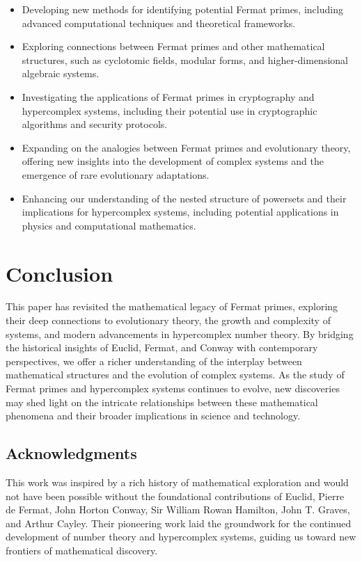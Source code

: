 \documentclass[12pt]{article}
\begin{document}
\begin{itemize}
    \item Developing new methods for identifying potential Fermat primes, including advanced computational techniques and theoretical frameworks.
    \item Exploring connections between Fermat primes and other mathematical structures, such as cyclotomic fields, modular forms, and higher-dimensional algebraic systems.
    \item Investigating the applications of Fermat primes in cryptography and hypercomplex systems, including their potential use in cryptographic algorithms and security protocols.
    \item Expanding on the analogies between Fermat primes and evolutionary theory, offering new insights into the development of complex systems and the emergence of rare evolutionary adaptations.
    \item Enhancing our understanding of the nested structure of powersets and their implications for hypercomplex systems, including potential applications in physics and computational mathematics.
\end{itemize}

\section{Conclusion}

This paper has revisited the mathematical legacy of Fermat primes, exploring their deep connections to evolutionary theory, the growth and complexity of systems, and modern advancements in hypercomplex number theory. By bridging the historical insights of Euclid, Fermat, and Conway with contemporary perspectives, we offer a richer understanding of the interplay between mathematical structures and the evolution of complex systems. As the study of Fermat primes and hypercomplex systems continues to evolve, new discoveries may shed light on the intricate relationships between these mathematical phenomena and their broader implications in science and technology.

\subsection*{Acknowledgments}
This work was inspired by a rich history of mathematical exploration and would not have been possible without the foundational contributions of Euclid, Pierre de Fermat, John Horton Conway, Sir William Rowan Hamilton, John T. Graves, and Arthur Cayley. Their pioneering work laid the groundwork for the continued development of number theory and hypercomplex systems, guiding us toward new frontiers of mathematical discovery.
\end{document}
